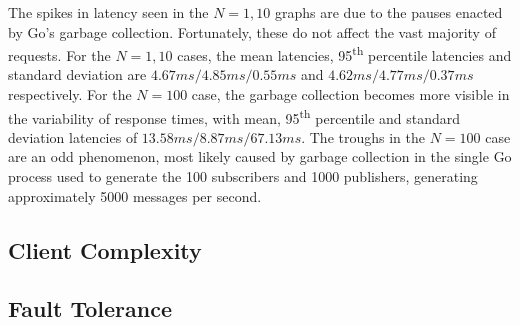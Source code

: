 The spikes in latency seen in the $N=1,10$ graphs are due to the pauses enacted by Go's garbage collection.
Fortunately, these do not affect the vast majority of requests.
For the $N=1,10$ cases, the mean latencies, 95\textsuperscript{th} percentile latencies and standard deviation are $4.67ms/4.85ms/0.55ms$ and $4.62ms/4.77ms/0.37ms$ respectively.
For the $N=100$ case, the garbage collection becomes more visible in the variability of response times, with mean, 95\textsuperscript{th} percentile and standard deviation latencies of $13.58ms/8.87ms/67.13ms$.
The troughs in the $N=100$ case are an odd phenomenon, most likely caused by garbage collection in the single Go process used to generate the 100 subscribers and 1000 publishers, generating approximately 5000 messages per second.

\subsection{Client Complexity}

\subsection{Fault Tolerance}
